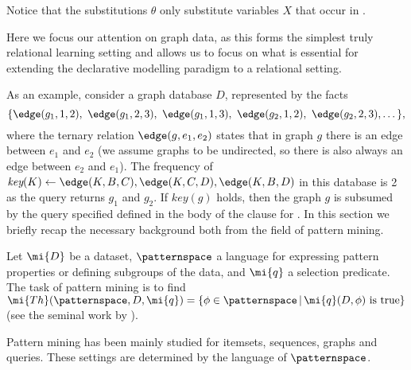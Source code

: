    Notice that the substitutions $\theta$ only substitute variables $X$ that occur in \keypred. 

   Here we focus our attention on graph data, as this forms the simplest truly relational learning setting and allows us to focus on what is essential for extending the declarative modelling paradigm to a relational setting. 
    
   As an example, consider a graph database $D$, represented by the facts 
   \begin{equation*}
   \{ \edge(g_1,1,2),~ \edge(g_1,2,3),~ \edge(g_1,1,3),~ \edge(g_2,1,2),~ \edge(g_2,2,3), \dots \},
   \end{equation*}
   where the ternary relation $\edge(g,e_1,e_2)$ states that in graph $g$ there is an edge between $e_1$ and $e_2$ (we assume graphs to be undirected, so there is also always an edge between $e_2$ and $e_1$). The frequency of $\textit{key}(K) \leftarrow \edge(K,B,C), \edge(K,C,D), \edge(K,B,D)$ in this database is 2 as the query returns $g_1$ and $g_2$. If $key(g)$ holds,  then the graph $g$ is subsumed by the query specified defined in the body of the clause for \keypred.
   In this section we briefly recap the necessary background both from the field of pattern mining.

   Let $\mi{D}$ be a dataset, $\patternspace$ a language for expressing pattern properties or defining subgroups of the
   data, and $\mi{q}$ a selection predicate. %
   The task of pattern mining is to find $\mi{Th}(\patternspace,D, \mi{q})= \{\phi \in \patternspace\, |\, \mi{q}(D, \phi) \text{ is true}\}$ (see the seminal work by \cite{DBLP:journals/datamine/MannilaT97}). 

   Pattern mining has been mainly studied for %
   itemsets, sequences, graphs and queries. These settings are determined by the language of $\patternspace$. 
\pubrevend
